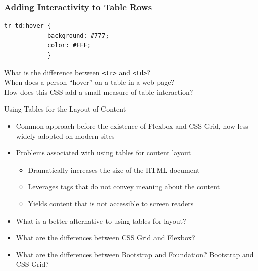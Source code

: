 \documentclass[14pt,aspectratio=169]{beamer}
\begin{document}
%
\begin{frame}[fragile]
  \frametitle{Adding Interactivity to Table Rows}
  \normalsize
  \hspace*{.25in}
  \begin{minipage}{6in}
    \vspace*{.2in}
    \begin{verbatim}
tr td:hover {
            background: #777;
            color: #FFF;
            }
    \end{verbatim}
  \end{minipage}
  \vspace*{.05in}
  \begin{center}
    \noindent What is the difference between {\tt <tr>} and {\tt <td>}?\\
    \noindent When does a person ``hover'' on a table in a web page?\\
    \noindent How does this CSS add a small measure of table interaction?\\
  \end{center}
\end{frame}

%
\begin{frame}{Using Tables for the Layout of Content}
  \begin{itemize}
    \item Common approach before the existence of Flexbox and CSS Grid, now less
      widely adopted on modern sites
      \vspace*{-.1in}
    \item Problems associated with using tables for content layout
      \begin{itemize}
        \item Dramatically increases the size of the HTML document
        \item Leverages tags that do not convey meaning about the content
        \item Yields content that is not accessible to screen readers
      \end{itemize}
      \vspace*{-.2in}
    \item What is a better alternative to using tables for layout?
      \vspace*{-.2in}
    \item What are the differences between CSS Grid and Flexbox?
      \vspace*{-.2in}
    \item What are the differences between Bootstrap and Foundation? Bootstrap
      and CSS Grid?
  \end{itemize}
\end{frame}
\end{document}
